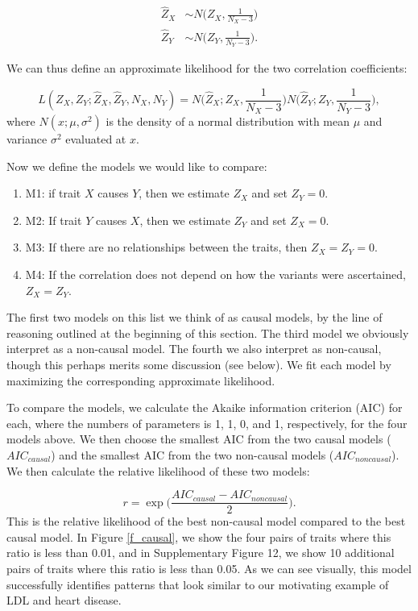 \documentclass[11pt,titlepage]{article}
\begin{document}
\begin{align}
\hat Z_X &\sim N \bigg(Z_X, \frac{1}{N_X - 3} \bigg)\\
\hat Z_Y &\sim N \bigg(Z_Y, \frac{1}{N_ Y- 3} \bigg).
\end{align}

We can thus define an approximate likelihood for the two correlation coefficients:

\begin{equation}
L( Z_X, Z_Y; \hat Z_X, \hat Z_Y, N_X, N_Y) = N \bigg( \hat Z_X; Z_X,  \frac{1}{N_X - 3} \bigg) N \bigg( \hat Z_Y; Z_Y,  \frac{1}{N_Y - 3} \bigg),
\end{equation}
\noindent where $N(x; \mu, \sigma^2)$ is the density of a normal distribution with mean $\mu$ and variance $\sigma^2$ evaluated at $x$. 

Now we define the models we would like to compare:

\begin{enumerate}
\item M1: if trait $X$ causes $Y$, then we estimate $Z_X$ and set $Z_Y = 0$.
\item M2: If trait $Y$ causes $X$, then we estimate $Z_Y$ and set $Z_X = 0$.
\item M3: If there are no relationships between the traits, then $Z_X = Z_Y = 0$.
\item M4: If the correlation does not depend on how the variants were ascertained, $Z_X = Z_Y$.
\end{enumerate}
The first two models on this list we think of as causal models, by the line of reasoning outlined at the beginning of this section. The third model we obviously interpret as a non-causal model. The fourth we also interpret as non-causal, though this perhaps merits some discussion (see below). We fit each model by maximizing the corresponding approximate likelihood. 

To compare the models, we calculate the Akaike information criterion (AIC) for each, where the numbers of parameters is 1, 1, 0, and 1, respectively, for the four models above. We then choose the smallest AIC from the two causal models ($AIC_{causal}$) and the smallest AIC from the two non-causal models ($AIC_{noncausal}$). We then calculate the relative likelihood of these two models:

\begin{equation}
r = \exp \bigg(\frac{AIC_{causal} - AIC_{noncausal}}{2} \bigg).
\end{equation}
This is the relative likelihood of the best non-causal model compared to the best causal model. In Figure \ref{f_causal}, we show the four pairs of traits where this ratio is less than 0.01, and in Supplementary Figure 12, we show 10 additional pairs of traits where this ratio is less than 0.05. As we can see visually, this model successfully identifies patterns that look similar to our motivating example of LDL and heart disease.
\end{document}
